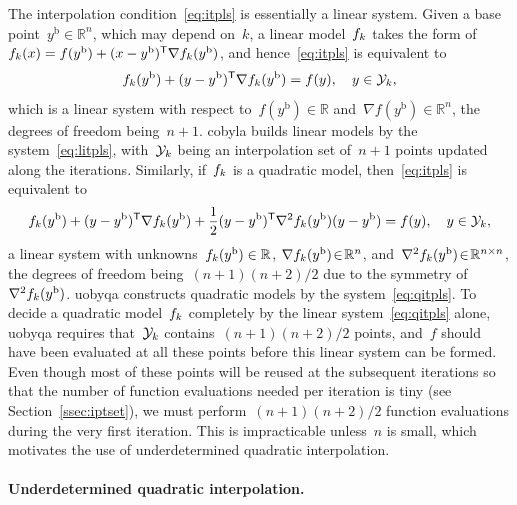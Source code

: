 \documentclass[
    smallextended,  %
    final,          %
]{svjour3}
\newcommand{\R}{\mathbb{R}}
\newcommand{\T}{\mathsf{T}}
\newcommand{\base}{{\text{b}}}
\newcommand{\objm}[1][k]{\obj\ifthenelse{\equal{#1}{}}{}{_{#1}}}
\newcommand{\obj}{f}
\newcommand{\xpt}[1][k]{\mathcal{Y}\ifthenelse{\equal{#1}{}}{}{_{#1}}}
\begin{document}
The interpolation condition~\eqref{eq:itpls} is essentially a linear system.
Given a base point~$y^{\base}\in \R^n$, which may depend on~$k$, a linear model~$\objm$ takes the
form of~$\objm(x) = \obj(y^{\base}) + (x - y^{\base})^{\T} \nabla \objm(y^{\base})$, and
hence~\eqref{eq:itpls} is equivalent to
\begin{equation}
    \label{eq:litpls}
    \objm(y^{\base}) + (y -y^{\base})^{\T} \nabla \objm(y^{\base})  = \obj(y),  \quad y \in \xpt,
\end{equation}
which is a linear system with respect to~$\obj(y^\base) \in \R$ and~$\nabla \obj(y^\base) \in \R^n$, the degrees of freedom being~$n+1$.
\Gls{cobyla} builds linear models by the system~\eqref{eq:litpls}, with~$\xpt$ being an interpolation
set of~$n+1$ points updated along the iterations.
Similarly, if~$\objm$ is a quadratic model, then~\eqref{eq:itpls} is equivalent to
\begin{equation}
    \label{eq:qitpls}
    \objm(y^{\base}) + (y -y^{\base})^{\T} \nabla \objm(y^{\base})
    + \frac{1}{2}(y-y^{\base})^{\T}  \nabla^2 \objm(y^{\base}) (y-y^{\base}) = \obj(y),  \quad y \in \xpt,
\end{equation}
a linear system with unknowns~$\objm(y^\base) \in \R$, $\nabla \objm(y^\base) \!\in\! \R^n$,
and~$\nabla^2 \objm(y^{\base})\!\in\!\R^{n \times n}$, the degrees of freedom being~$(n + 1)(n + 2) / 2$ due to the symmetry of~$\nabla^2 \objm(y^\base)$.
\gls{uobyqa} constructs quadratic models by the system~\eqref{eq:qitpls}.
To decide a quadratic model~$\objm$ completely by the linear system~\eqref{eq:qitpls} alone,
\gls{uobyqa} requires that~$\xpt$ contains~$(n+1)(n+2)/2$ points, and~$f$ should have been evaluated at all these points before this linear system can be formed.
Even though most of these points will be reused at the subsequent iterations so that the number of
function evaluations needed per iteration is tiny (see Section~\ref{ssec:iptset}), we must perform~$(n + 1)(n + 2) / 2$ function evaluations during the very first iteration.
This is impracticable unless~$n$ is small, which motivates the use of underdetermined quadratic interpolation.

\paragraph{\textnormal{\textbf{Underdetermined quadratic interpolation.}}}
\end{document}
